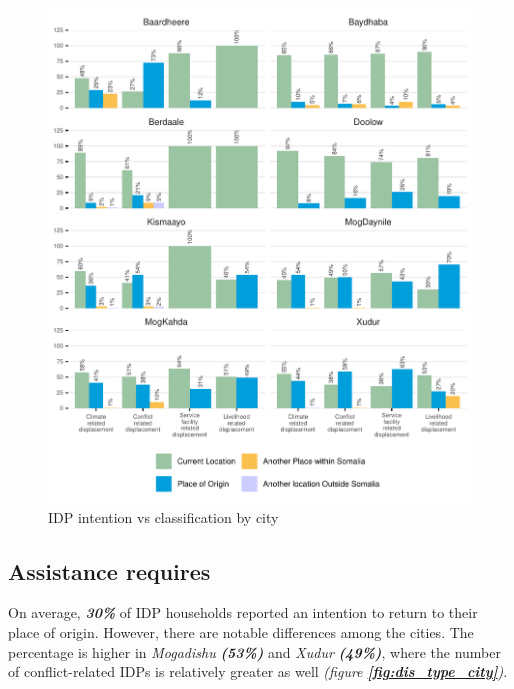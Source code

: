 \documentclass[
]{article}
\begin{document}
\begin{figure}[H]

{\centering \includegraphics{climate_vs_conflict_files/figure-latex/in_classi_city-1} 

}

\caption{IDP intention vs classification by city}\label{fig:in_classi_city}
\end{figure}

\subsection{Assistance requires}\label{assistance-requires}

On average, \textbf{\emph{30\%}} of IDP households reported an intention
to return to their place of origin. However, there are notable
differences among the cities. The percentage is higher in
\emph{Mogadishu} \textbf{\emph{(53\%)}} and \emph{Xudur}
\textbf{\emph{(49\%)}}, where the number of conflict-related IDPs is
relatively greater as well \emph{(figure
\textbf{\textcolor{blue}{\ref{fig:dis_type_city}}})}.
\end{document}
